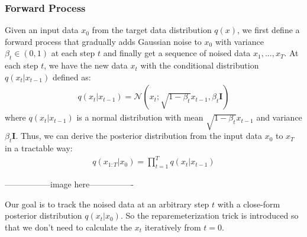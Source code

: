 \documentclass[12pt,DIV14,BCOR12mm,a4paper,footinclude=false,headinclude,parskip=half-,twoside,openright,cleardoublepage=empty,toc=index,bibliography=totoc,listof=totoc]{scrreprt}
\numberwithin{equation}{chapter}
\begin{document}
\subsubsection{Forward Process}
Given an input data $x_{0}$ from the target data distribution $q(x)$, we first define a forward process that gradually adds Gaussian noise to 
$x_{0}$ with variance $\beta_{t}\in (0, 1)$ at each step $t$ and finally get a sequence of noised data $x_{1},...,x_{T}$. 
At each step $t$, we have the new data $x_{t}$ with the conditional distribution $q(x_{t}|x_{t-1})$ defined as:
\begin{align}
  q(x_{t}|x_{t-1}) = \mathcal{N}(x_{t}; \sqrt{1-\beta_{t}}x_{t-1}, \beta_{t}\textbf{I})
\end{align}
where $q(x_{t}|x_{t-1})$ is a normal distribution with mean $\sqrt{1-\beta_{t}}x_{t-1}$ and variance $\beta_{t}\textbf{I}$. 
Thus, we can derive the posterior distribution from the input data $x_{0}$ to $x_{T}$ in a tractable way:
\begin{align}
  q(x_{1:T}|x_{0}) = \prod_{t=1}^{T}q(x_{t}|x_{t-1})
\end{align}

-----------------image here----------------

Our goal is to track the noised data at an arbitrary step $t$ with a close-form posterior distribution $q(x_{t}|x_{0})$. 
So the reparemeterization trick is introduced so that we don't need to calculate the $x_{t}$ iteratively from $t=0$.
\end{document}
